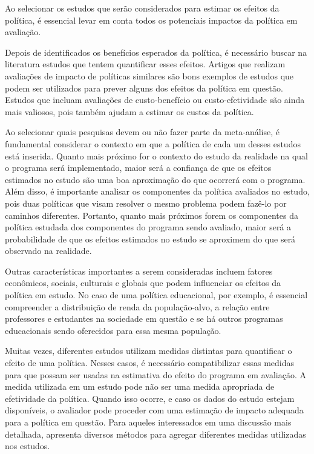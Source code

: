 \documentclass[12pt,letterpaper]{article}
\newcommand{\1}{\mathbbm{1}}
\numberwithin{equation}{section}
\begin{document}

Ao selecionar os estudos que serão considerados para estimar os efeitos da política, é essencial levar em conta todos os potenciais impactos da política em avaliação.

Depois de identificados os benefícios esperados da política, é necessário buscar na literatura estudos que tentem quantificar esses efeitos. Artigos que realizam avaliações de impacto de políticas similares são bons exemplos de estudos que podem ser utilizados para prever alguns dos efeitos da política em questão. Estudos que incluam avaliações de custo-benefício ou custo-efetividade são ainda mais valiosos, pois também ajudam a estimar os custos da política.

Ao selecionar quais pesquisas devem ou não fazer parte da meta-análise, é fundamental considerar o contexto em que a política de cada um desses estudos está inserida. Quanto mais próximo for o contexto do estudo da realidade na qual o programa será implementado, maior será a confiança de que os efeitos estimados no estudo são uma boa aproximação do que ocorrerá com o programa. Além disso, é importante analisar os componentes da política avaliados no estudo, pois duas políticas que visam resolver o mesmo problema podem fazê-lo por caminhos diferentes. Portanto, quanto mais próximos forem os componentes da política estudada dos componentes do programa sendo avaliado, maior será a probabilidade de que os efeitos estimados no estudo se aproximem do que será observado na realidade.

Outras características importantes a serem consideradas incluem fatores econômicos, sociais, culturais e globais que podem influenciar os efeitos da política em estudo. No caso de uma política educacional, por exemplo, é essencial compreender a distribuição de renda da população-alvo, a relação entre professores e estudantes na sociedade em questão e se há outros programas educacionais sendo oferecidos para essa mesma população.

Muitas vezes, diferentes estudos utilizam medidas distintas para quantificar o efeito de uma política. Nesses casos, é necessário compatibilizar essas medidas para que possam ser usadas na estimativa do efeito do programa em avaliação. A medida utilizada em um estudo pode não ser uma medida apropriada de efetividade da política. Quando isso ocorre, e caso os dados do estudo estejam disponíveis, o avaliador pode proceder com uma estimação de impacto adequada para a política em questão. Para aqueles interessados em uma discussão mais detalhada, \cite{wsipp_benefit-cost_2019} apresenta diversos métodos para agregar diferentes medidas utilizadas nos estudos.
\end{document}
